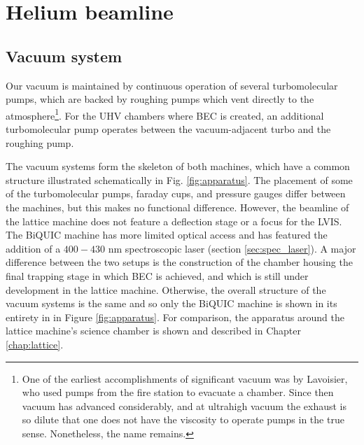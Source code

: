 \section{Helium beamline}

\subsection{Vacuum system}
	Our vacuum is maintained by continuous operation of several turbomolecular pumps, which are backed by roughing pumps which vent directly to the atmosphere\footnote{One of the earliest accomplishments of significant vacuum was by Lavoisier, who used pumps from the fire station to evacuate a chamber.
	Since then vacuum has advanced considerably, and at ultrahigh vacuum the exhaust is so dilute that one does not have the viscosity to operate pumps in the true sense.
	Nonetheless, the name remains.}.
	For the UHV chambers where BEC is created, an additional turbomolecular pump operates between the vacuum-adjacent turbo and the roughing pump.
	
	The vacuum systems form the skeleton of both machines, which have a common structure illustrated schematically in Fig. \ref{fig:apparatus}.
	The placement of some of the turbomolecular pumps, faraday cups, and pressure gauges differ between the machines, but this makes no functional difference.
	However, the beamline of the lattice machine does not feature a deflection stage or a focus for the LVIS.
	The BiQUIC machine has more limited optical access and has featured the addition of a $400-430$ nm spectroscopic laser (section \ref{sec:spec_laser}).
	A major difference between the two setups is the construction of the chamber housing the final trapping stage in which BEC is achieved, and which is still under development in the lattice machine.
	Otherwise, the overall structure of the vacuum systems is the same and so only the BiQUIC machine is shown in its entirety in in Figure \ref{fig:apparatus}.
	For comparison, the apparatus around the lattice machine's science chamber is shown and described in Chapter \ref{chap:lattice}.

